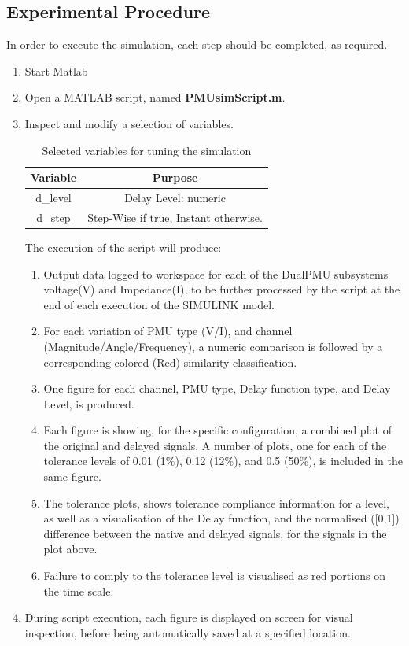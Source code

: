 \subsection{Experimental Procedure}
In order to execute the simulation, each step should be completed, as required.
\begin{enumerate}
    \item Start Matlab
    \item Open a MATLAB script, named \textbf{PMUsimScript.m}.
    \item Inspect and modify a selection of variables. 
    \begin{table}[H]
        \centering
        \begin{tabular}{|c|c|}
        \hline
           \textbf{Variable}  &  \textbf{Purpose}  \\
           \hline
                     d\_level         &  Delay Level: numeric \\
               \hline
                     d\_step  &Step-Wise if true,  Instant otherwise. 
               \\      \hline
        \end{tabular}
        \caption{Selected variables for tuning the simulation}
        \label{tab:my_label}
    \end{table}
    The execution of the script will produce:
    \begin{enumerate}
    \item Output data logged to workspace for each of the DualPMU subsystems voltage(V) and Impedance(I), to be further processed by the script at the end of each execution of the SIMULINK model.
    \item For each variation of PMU type (V/I), and channel (Magnitude/Angle/Frequency), a numeric comparison is followed by a corresponding colored (Red) similarity classification.
    \item One figure for each channel,  PMU type,  Delay function type, and Delay Level, is produced.
    \item Each figure is showing, for the specific configuration, a combined plot of the original and delayed signals. A number of plots, one for each of the tolerance levels of 0.01 (1\%), 0.12 (12\%), and 0.5 (50\%), is included in the same figure.
    \item The tolerance plots, shows  tolerance compliance information for a level, as well as a visualisation of the Delay function, and the normalised ([0,1]) difference between the native and delayed signals, for the signals in the plot above.
    \item Failure to comply to the tolerance level is visualised as red portions on the time scale.
    \end{enumerate}
    \item During script execution, each figure is displayed on screen for visual inspection, before being automatically saved at a specified location. 
\end{enumerate}

